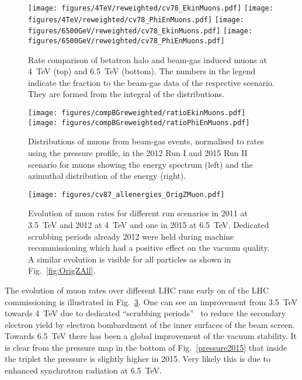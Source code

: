 \begin{figure}
\begin{center}
  \texttt{[image: figures/4TeV/reweighted/cv78\_EkinMuons.pdf]}
  \texttt{[image: figures/4TeV/reweighted/cv78\_PhiEnMuons.pdf]}
  \texttt{[image: figures/6500GeV/reweighted/cv78\_EkinMuons.pdf]}
  \texttt{[image: figures/6500GeV/reweighted/cv78\_PhiEnMuons.pdf]}
\end{center}
\vspace{-0.6cm}
 \caption{Rate comparison of betatron halo and beam-gas induced muons at 4~TeV (top) and 6.5~TeV (bottom). The numbers in the legend indicate the fraction to the beam-gas data of the respective scenario. They are formed from the integral of the distributions.
  \label{compAllBKG_run12}}
\end{figure}

\begin{figure}%
\centering

\texttt{[image: figures/compBGreweighted/ratioEkinMuons.pdf]}
\texttt{[image: figures/compBGreweighted/ratioPhiEnMuons.pdf]}
\caption{Distributions of muons from beam-gas events, normalised to rates using the pressure profile, in the 2012 Run I and 2015 Run II scenario for muons showing the energy spectrum (left) and the azimuthal distribution of the energy (right).
  \label{fig:compBGreweighted1}}
\end{figure}


\begin{figure}
\begin{center}
  \texttt{[image: figures/cv87\_allenergies\_OrigZMuon.pdf]}
\end{center}
\vspace{-0.6cm}
 \caption{Evolution of muon rates for different run scenarios in 2011 at 3.5~TeV and 2012 at 4~TeV and one in 2015 at 6.5~TeV. Dedicated scrubbing periods already 2012 were held during machine recommissioning which had a positive effect on the vacuum quality. A similar evolution is visible for all particles as shown in Fig.~\ref{fig:OrigZAll}.
  \label{fig:OrigZMuon}} 
\end{figure}


The evolution of muon rates over different LHC runs early on of the LHC commissioning is illustrated in Fig.~\ref{fig:OrigZMuon}. One can see an improvement from 3.5~TeV towards 4~TeV due to dedicated ``scrubbing periods''~\cite{iadarolaEvian2012} to reduce the secondary electron yield by electron bombardment of the inner surfaces of the beam screen. Towards 6.5~TeV there has been a global improvement of the vacuum stability. It is clear from the pressure map in the bottom of Fig.~\ref{pressure2015} that inside the triplet the pressure is slightly higher in 2015. Very likely this is due to enhanced synchrotron radiation at 6.5~TeV. 

